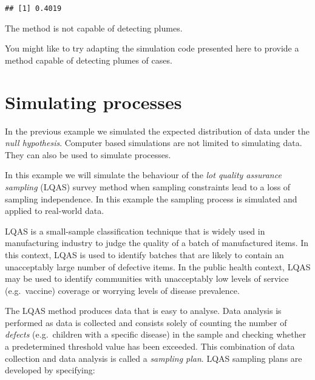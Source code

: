 \documentclass[
  12pt,
  a4paper]{book}
\begin{document}
\begin{verbatim}
## [1] 0.4019
\end{verbatim}

The method is not capable of detecting plumes.

You might like to try adapting the simulation code presented here to provide a method capable of detecting plumes of cases.

\hypertarget{simulating-processes}{%
\section{Simulating processes}\label{simulating-processes}}

In the previous example we simulated the expected distribution of data under the \emph{null hypothesis}. Computer based simulations are not limited to simulating data. They can also be used to simulate processes.

In this example we will simulate the behaviour of the \emph{lot quality assurance sampling} (LQAS) survey method when sampling constraints lead to a loss of sampling independence. In this example the sampling process is simulated and applied to real-world data.

LQAS is a small-sample classification technique that is widely used in manufacturing industry to judge the quality of a batch of manufactured items. In this context, LQAS is used to identify batches that are likely to contain an unacceptably large number of defective items. In the public health context, LQAS may be used to identify communities with unacceptably low levels of service (e.g.~vaccine) coverage or worrying levels of disease prevalence.

The LQAS method produces data that is easy to analyse. Data analysis is performed as data is collected and consists solely of counting the number of \emph{defects} (e.g.~children with a specific disease) in the sample and checking whether a predetermined threshold value has been exceeded. This combination of data collection and data analysis is called a \emph{sampling plan}. LQAS sampling plans are developed by specifying:
\end{document}
